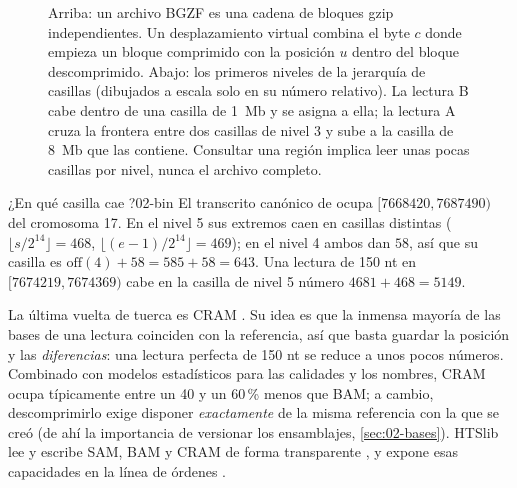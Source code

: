 \begin{figure}[t]
\caption[BGZF y casillas del índice BAI]{Arriba: un archivo BGZF es una cadena de bloques gzip independientes. Un desplazamiento virtual combina el byte $c$ donde empieza un bloque comprimido con la posición $u$ dentro del bloque descomprimido. Abajo: los primeros niveles de la jerarquía de casillas (dibujados a escala solo en su número relativo). La lectura B cabe dentro de una casilla de \SI{1}{Mb} y se asigna a ella; la lectura A cruza la frontera entre dos casillas de nivel 3 y sube a la casilla de \SI{8}{Mb} que las contiene. Consultar una región implica leer unas pocas casillas por nivel, nunca el archivo completo.}
\label{fig:02-bgzf}
\end{figure}

\begin{ejemplo}{¿En qué casilla cae ?}{02-bin}
El transcrito canónico de  ocupa $[\num{7668420}, \num{7687490})$ del cromosoma 17. En el nivel 5 sus extremos caen en casillas distintas ($\lfloor s/2^{14}\rfloor = 468$, $\lfloor (e-1)/2^{14}\rfloor = 469$); en el nivel 4 ambos dan $58$, así que su casilla es $\mathrm{off}(4)+58=585+58 = 643$. Una lectura de 150 nt en $[\num{7674219},\num{7674369})$ cabe en la casilla de nivel 5 número $4681+468 = 5149$.
\end{ejemplo}

La última vuelta de tuerca es CRAM \parencite{c02-hsiyangfritz2011}. Su idea es que la inmensa mayoría de las bases de una lectura coinciden con la referencia, así que basta guardar la posición y las \emph{diferencias}: una lectura perfecta de 150 nt se reduce a unos pocos números. Combinado con modelos estadísticos para las calidades y los nombres, CRAM ocupa típicamente entre un 40 y un 60\,\% menos que BAM; a cambio, descomprimirlo exige disponer \emph{exactamente} de la misma referencia con la que se creó (de ahí la importancia de versionar los ensamblajes, \cref{sec:02-bases}). HTSlib lee y escribe SAM, BAM y CRAM de forma transparente \parencite{c02-bonfield2021}, y  expone esas capacidades en la línea de órdenes \parencite{c02-danecek2021}.



